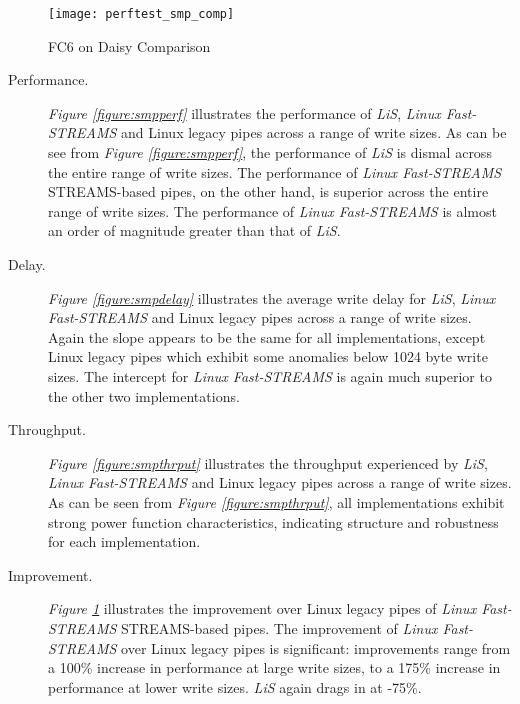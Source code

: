 \documentclass[letterpaper,final,notitlepage,twocolumn,10pt,twoside]{article}
\begin{document}
\begin{figure}[pt]
\texttt{[image: perftest\_smp\_comp]}
\caption[FC6 on Daisy Comparison]{FC6 on Daisy Comparison}
\label{figure:smpcomp}
\end{figure}

\begin{description}

\item[Performance.]

\textit{Figure \ref{figure:smpperf}}
illustrates the performance of \textsl{LiS}, \textsl{Linux Fast-STREAMS} and Linux legacy pipes
across a range of write sizes.  As can be see from \textit{Figure \ref{figure:smpperf}}, the
performance of \textsl{LiS} is dismal across the entire range of write sizes.  The performance of
\textsl{Linux Fast-STREAMS} STREAMS-based pipes, on the other hand, is superior across the entire
range of write sizes.  The performance of \textsl{Linux Fast-STREAMS} is almost an order of
magnitude greater than that of \textsl{LiS}.

\item[Delay.]

\textit{Figure \ref{figure:smpdelay}}
illustrates the average write delay for \textsl{LiS}, \textsl{Linux Fast-STREAMS} and Linux legacy
pipes across a range of write sizes.  Again the slope appears to be the same for all
implementations, except Linux legacy pipes which exhibit some anomalies below 1024 byte write sizes.
The intercept for \textsl{Linux Fast-STREAMS} is again much superior to the other two
implementations.

\item[Throughput.]

\textit{Figure \ref{figure:smpthrput}}
illustrates the throughput experienced by \textsl{LiS}, \textsl{Linux Fast-STREAMS} and Linux legacy
pipes across a range of write sizes.  As can be seen from \textit{Figure \ref{figure:smpthrput}},
all implementations exhibit strong power function characteristics, indicating structure and
robustness for each implementation.

\item[Improvement.]

\textit{Figure \ref{figure:smpcomp}}
illustrates the improvement over Linux legacy pipes of \textsl{Linux Fast-STREAMS} STREAMS-based
pipes.  The improvement of \textsl{Linux Fast-STREAMS} over Linux legacy pipes is significant:
improvements range from a 100\% increase in performance at large write sizes, to a 175\% increase in
performance at lower write sizes.  \textsl{LiS} again drags in at -75\%.

\end{description}
\end{document}
